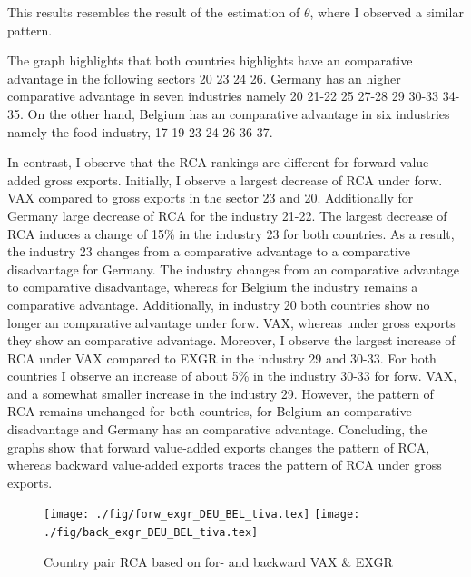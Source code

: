 This results resembles the result of the estimation of $\theta$, where I observed a similar pattern. \par
The graph highlights that both countries highlights have an comparative advantage in the following sectors 20 23 24 26.
Germany has an higher comparative advantage in seven industries namely 20 21-22 25 27-28 29 30-33 34-35.
On the other hand, Belgium has an comparative advantage in six industries namely the food industry, 17-19 23 24 26 36-37.
 \par
In contrast, I observe that the RCA rankings are different for forward value-added gross exports.
Initially, I observe a largest decrease of RCA under forw. VAX compared to gross exports in the sector 23 and 20.
Additionally for Germany large decrease of RCA for the industry 21-22.
The largest decrease of RCA induces a change of 15\%  in the industry 23 for both countries.
As a result, the industry 23 changes from a comparative advantage to a comparative disadvantage for Germany.
The industry changes from an comparative advantage to comparative disadvantage, whereas for Belgium the industry remains a comparative advantage.
Additionally, in industry 20 both countries show no longer an comparative advantage under forw. VAX, whereas under gross exports they show an comparative advantage.
Moreover, I observe the largest increase of RCA under VAX compared to EXGR in the industry 29 and 30-33.
For both countries I observe an increase of about 5\% in the industry 30-33 for forw. VAX, and a somewhat smaller increase in the industry 29.
However, the pattern of RCA remains unchanged for both countries, for Belgium an comparative disadvantage and Germany has an comparative advantage.
Concluding, the graphs show that forward value-added exports changes the pattern of RCA, whereas backward value-added exports traces the pattern of RCA under gross exports.
 \begin{figure}
\caption{Country pair RCA based on for- and backward  VAX \& EXGR }
\texttt{[image: ./fig/forw\_exgr\_DEU\_BEL\_tiva.tex]}
\texttt{[image: ./fig/back\_exgr\_DEU\_BEL\_tiva.tex]}
\end{figure}

